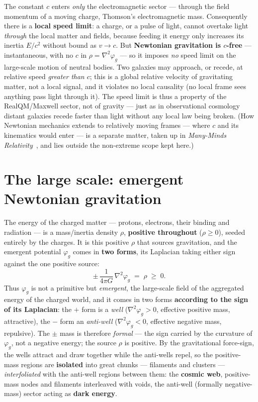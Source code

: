 \documentclass[11pt]{article}
\newcommand{\grad}{\nabla}
\begin{document}
The constant $c$ enters \emph{only} the electromagnetic sector --- through the field momentum of a moving charge,
Thomson's electromagnetic mass. Consequently there is a \textbf{local speed limit}: a charge, or a pulse of light,
cannot overtake light \emph{through} the local matter and fields, because feeding it energy only increases its
inertia $E/c^2$ without bound as $v\to c$. But \textbf{Newtonian gravitation is $c$-free} --- instantaneous, with
no $c$ in $\rho=\grad^2\varphi_g$ --- so it imposes \emph{no} speed limit on the large-scale motion of neutral
bodies. Two galaxies may approach, or recede, at relative speed \emph{greater than $c$}; this is a global relative
velocity of gravitating matter, not a local signal, and it violates no local causality (no local frame sees
anything pass light through it). The speed limit is thus a property of the RealQM/Maxwell sector, not of gravity ---
just as in observational cosmology distant galaxies recede faster than light without any local law being broken.
(How Newtonian mechanics extends to relatively moving frames --- where $c$ and its kinematics would enter --- is a
separate matter, taken up in \emph{Many-Minds Relativity}~\cite{mmr}, and lies outside the non-extreme scope kept
here.)

\section{The large scale: emergent Newtonian gravitation}\label{sec:large}
The energy of the charged matter --- protons, electrons, their binding and radiation --- is a mass/inertia density
$\rho$, \textbf{positive throughout} ($\rho\ge 0$), seeded entirely by the charges. It is this positive $\rho$ that
sources gravitation, and the emergent potential $\varphi_g$ comes in \textbf{two forms}, its Laplacian taking
either sign against the one positive source:
\begin{equation}
\pm\,\frac{1}{4\pi G}\,\grad^2\varphi_g \;=\; \rho \;\ge\; 0 .
\end{equation}
Thus $\varphi_g$ is not a primitive but \emph{emergent}, the large-scale field of the aggregated energy of the
charged world, and it comes in two forms \textbf{according to the sign of its Laplacian}: the $+$ form is a
\emph{well} ($\grad^2\varphi_g>0$, effective positive mass, attractive), the $-$ form an \emph{anti-well}
($\grad^2\varphi_g<0$, effective negative mass, repulsive). The $\pm$ mass is therefore \emph{formal} --- the sign
carried by the curvature of $\varphi_g$, not a negative energy; the source $\rho$ is positive. By the gravitational force-sign, the wells
attract and draw together while the anti-wells repel, so the positive-mass regions are \textbf{isolated} into great
chunks --- filaments and clusters --- \emph{interfoliated} with the anti-well regions between them: the
\textbf{cosmic web}, positive-mass nodes and filaments interleaved with voids, the anti-well (formally
negative-mass) sector acting as \textbf{dark energy}.
\end{document}
